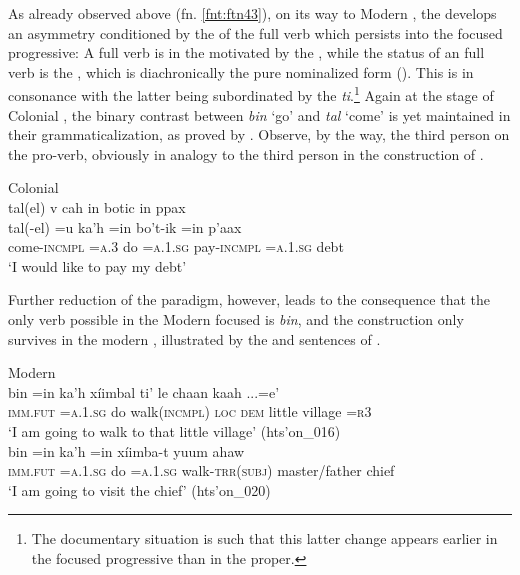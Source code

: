 \documentclass[output=paper]{langsci/langscibook}
\begin{document}
As already observed above (fn. \ref{fnt:ftn43}), on its way to Modern  , the  develops an asymmetry conditioned by the  of the full verb which persists into the focused progressive: A  full verb  is in the  motivated by the , while the status of an  full verb  is the , which is diachronically the pure nominalized form (). This is in consonance with the latter being subordinated by the  \textit{ti}.\footnote{The documentary situation is such that this latter change appears earlier in the focused progressive than in the  proper.} Again at the stage of Colonial  , the binary contrast between \textit{bin} ‘go’ and \textit{tal} ‘come’ is yet maintained in their grammaticalization, as proved by . Observe, by the way, the third person on the pro-verb, obviously in analogy to the third person in the  construction of .

\ea\label{ex:lehmann:81}
Colonial  \\

\ea tal(el)        v      cah    in        botic      in        ppax\\
\gll   tal(-el)        =u    ka’h    =in      bo’t-ik      =in      p’aax\\
come-\textsc{incmpl} \textsc{=a.3}    do      =\textsc{a.1.sg}    pay-\textsc{incmpl} \textsc{=a.1.sg}    debt\\
\glt ‘I would like to pay my debt’ \citep[69]{Coronel1620}
\z
\z

Further reduction of the paradigm, however, leads to the consequence that the only verb possible in the Modern   focused  is \textit{bin}, and the construction only survives in the modern , illustrated by the  and  sentences of .

\ea\label{ex:lehmann:82}
Modern  \\
\ea 
\gll bin      =in      ka'h  xíimbal      ti'    le    chaan  kaah ...=e'\\
  \textsc{imm.fut} \textsc{=a.1.sg}   do    walk(\textsc{incmpl) } \textsc{loc } \textsc{dem}  little    village  =\textsc{r3}\\
\glt ‘I am going to walk to that little village’ (hts'on\_016)\\
\ex
\gll bin      =in      ka'h  =in      xíimba-t        yuum          ahaw\\
\textsc{imm.fut} \textsc{=a.1.sg}   do    =\textsc{a.1.sg}    walk-\textsc{trr(subj)}    master/father  chief\\
\glt ‘I am going to visit the chief’ (hts'on\_020)
\z
\z 
\end{document}
